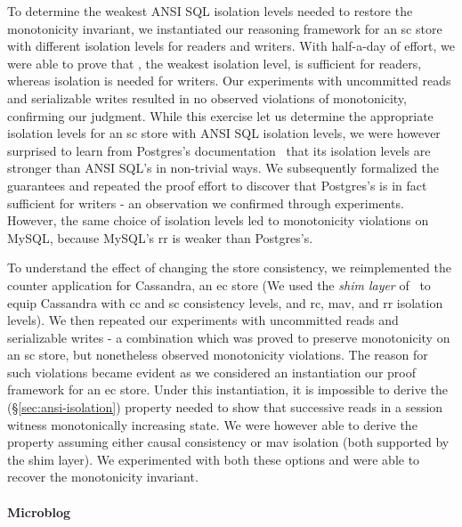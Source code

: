To determine the weakest ANSI SQL isolation levels needed to restore
the monotonicity invariant, we instantiated our reasoning framework
for an {\sc sc} store with different isolation levels for readers and
writers.  With half-a-day of effort, we were able to prove that
, the weakest isolation level, is sufficient
for readers, whereas  isolation is needed for
writers. Our experiments with uncommitted reads and serializable
writes resulted in no observed violations of monotonicity, confirming
our judgment. While this exercise let us determine the appropriate
isolation levels for an {\sc sc} store with ANSI SQL isolation levels,
we were however surprised to learn from Postgres's
documentation~\cite{postgres} that its isolation levels are stronger
than ANSI SQL's in non-trivial ways. We subsequently formalized the
guarantees and repeated the proof effort to discover that Postgres's
 is in fact sufficient for writers - an
observation we confirmed through experiments. However, the same choice
of isolation levels led to monotonicity violations on MySQL, because
MySQL's {\sc rr} is weaker than Postgres's.

To understand the effect of changing the store consistency, we
reimplemented the counter application for Cassandra, an {\sc ec} store
(We used the \emph{shim layer} of~\cite{pldi15} to equip Cassandra
with {\sc cc} and {\sc sc} consistency levels, and {\sc rc}, {\sc
mav}, and {\sc rr} isolation levels). We then repeated our experiments
with uncommitted reads and serializable writes - a combination which
was proved to preserve monotonicity on an {\sc sc} store, but
nonetheless observed monotonicity violations. The reason for such
violations became evident as we considered an instantiation our proof
framework for an {\sc ec} store. Under this instantiation, it is
impossible to derive the  (\S\ref{sec:ansi-isolation})
property needed to show that successive reads in a session witness
monotonically increasing state. We were however able to derive the
property assuming either causal consistency or {\sc mav} isolation
(both supported by the shim layer). We experimented with both these
options and were able to recover the monotonicity invariant.


\paragraph{Microblog}

